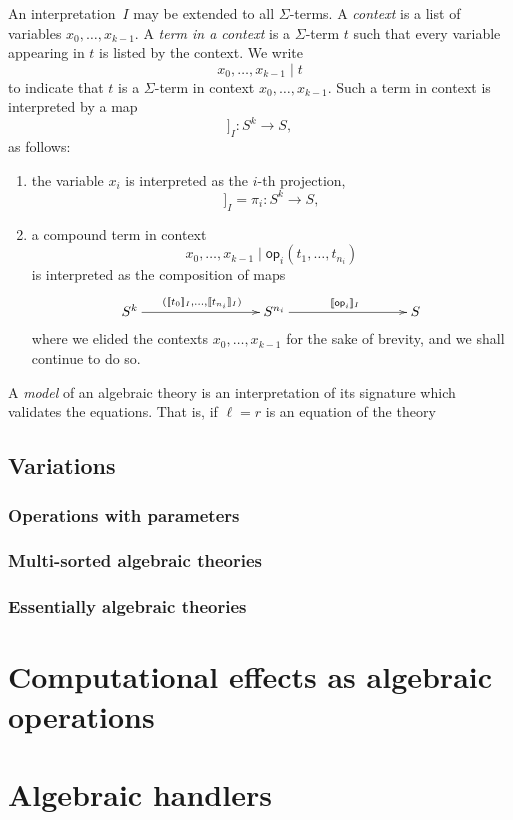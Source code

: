 \documentclass{amsart}
\newcommand{\op}{\mathsf{op}}
\newcommand{\sem}[1]{[\![#1]\!]}
\begin{document}
An interpretation~$I$ may be extended to all $\Sigma$-terms. A \emph{context} is a list of
variables $x_0, \ldots, x_{k-1}$. A \emph{term in a context} is a $\Sigma$-term $t$
such that every variable appearing in $t$ is listed by the context. We write
%
\begin{equation*}
  x_0, \ldots, x_{k-1} \mid t
\end{equation*}
%
to indicate that $t$ is a $\Sigma$-term in context $x_0, \ldots, x_{k-1}$. Such a term in
context is interpreted by a map
%
\begin{equation*}
  \sem{x_0, \ldots, x_{k-1} \mid t}_I : S^k \to S,
\end{equation*}
%
as follows:
% 
\begin{enumerate}
\item the variable $x_i$ is interpreted as the $i$-th projection,
  \begin{equation*}
    \sem{x_0, \ldots, x_{k-1} \mid  x_i}_I = \pi_i : S^k \to S,
  \end{equation*}
\item a compound term in context 
  \begin{equation*}
    x_0, \ldots, x_{k-1} \mid \op_i(t_1, \ldots, t_{n_i})
  \end{equation*}
  is interpreted as the composition of maps
  \begin{equation*}
    \xymatrix@+6em{
      {S^k} \ar[r]^{(\sem{t_0}_I, \ldots, \sem{t_{n_i}}_I)}
      &
      {S^{n_i}} \ar[r]^{\sem{\op_i}_I}
      &
      {S}
    }
  \end{equation*}
  where we elided the contexts $x_0, \ldots, x_{k-1}$ for the sake of brevity, and we
  shall continue to do so.
\end{enumerate}
%
A \emph{model} of an algebraic theory is an interpretation of its signature which
validates the equations. That is, if $\ell = r$ is an equation of the theory


\subsection{Variations}
\label{sec:variations}

\subsubsection{Operations with parameters}
\label{sec:oper-with-param}

\subsubsection{Multi-sorted algebraic theories}
\label{sec:multi-sort-algebr}

\subsubsection{Essentially algebraic theories}
\label{sec:essent-algebr-theor}



\section{Computational effects as algebraic operations}
\label{sec:comp-effects-as}

\section{Algebraic handlers}
\label{sec:algebraic-handlers}
\end{document}
